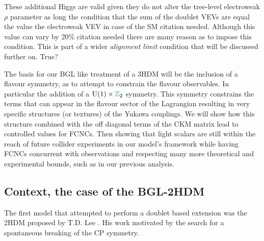 These additional Higgs  are valid given they do not alter the tree-level electroweak $\rho$ parameter as long the condition that the sum of the doublet VEVs are equal  the value  the electroweak VEV in case of the SM {\color{blue} citation needed}. 
% 
Although this value can vary by 20\% { \color{blue} citation needed} there are many reason as to impose this condition.
%
This is  part of a wider \textit{alignment limit} condition that will be discussed further on. { \color{blue} True? } 

The basis for our BGL like treatment of a 3HDM will be the inclusion of a flavour symmetry, as to attempt to constrain the flavour observables. In particular\Joaoadd{,} the addition of a $\mathrm{U}(1) \times \Joaoadd{\mathbb{Z}}_2$ symmetry.
% 
This symmetry constrains the terms that can appear in the flavour sector of the Lagrangian resulting in very specific structures (or textures) of the Yukawa couplings.
% 
We will show how this structure combined with the off diagonal terms of the CKM matrix lead to controlled values for FCNCs. 
%
%
Then showing that light scalars are still within the reach of future collider experiments in our model's framework while having FCNCs concurrent with observations and respecting many more theoretical and experimental bounds, such as in our previous analysis. 


\subsection{Context, the case of the BGL-2HDM}

The first model that attempted to perform a doublet based extension was the  2HDM proposed by T.D. Lee \cite{Lee1973}.  
%
His work  motivated by the search for a spontaneous breaking of the CP symmetry. 

